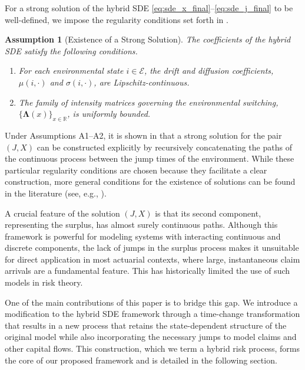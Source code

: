 \documentclass[11pt]{article}
\numberwithin{table}{section}
\numberwithin{figure}{section}
\numberwithin{equation}{section}
\newcommand{\1}{{\mathbf 1}}
\newcommand{\0}{\mat{0}}
\newtheorem{assumption}{Assumption}
\begin{document}
For a strong solution of the hybrid SDE \eqref{eq:sde_x_final}--\eqref{eq:sde_j_final} to be well-defined, we impose the regularity conditions set forth in \cite{albrecher2022space}.

\begin{assumption}[Existence of a Strong Solution]
\label{ass:existence_final}
The coefficients of the hybrid SDE satisfy the following conditions.
\begin{enumerate}
    \item[A1.] For each environmental state \(i \in \mathcal{E}\), the drift and diffusion coefficients, \(\mu(i, \cdot)\) and \(\sigma(i, \cdot)\), are Lipschitz-continuous.
    \item[A2.] The family of intensity matrices governing the environmental switching, \(\{\bm{\Lambda}(x)\}_{x \in \mathbb{R}}\), is uniformly bounded.
\end{enumerate}
\end{assumption}

Under Assumptions A1--A2, it is shown in \cite{albrecher2022space} that a strong solution for the pair \((J,X)\) can be constructed explicitly by recursively concatenating the paths of the continuous process between the jump times of the environment. While these particular regularity conditions are chosen because they facilitate a clear construction, more general conditions for the existence of solutions can be found in the literature (see, e.g., \cite{yin2010hybrid}).

A crucial feature of the solution \((J,X)\) is that its second component, representing the surplus, has almost surely continuous paths. Although this framework is powerful for modeling systems with interacting continuous and discrete components, the lack of jumps in the surplus process makes it unsuitable for direct application in most actuarial contexts, where large, instantaneous claim arrivals are a fundamental feature. This has historically limited the use of such models in risk theory.

One of the main contributions of this paper is to bridge this gap. We introduce a modification to the hybrid SDE framework through a time-change transformation that results in a new process that retains the state-dependent structure of the original model while also incorporating the necessary jumps to model claims and other capital flows. This construction, which we term a hybrid risk process, forms the core of our proposed framework and is detailed in the following section.
\end{document}
